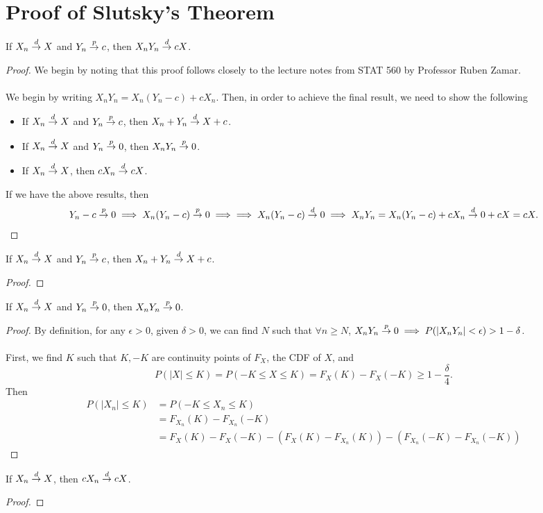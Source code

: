 

\section{Proof of Slutsky's Theorem}
\begin{theorem}
If $X_n \overset{d}{\rightarrow} X$ and $Y_n \overset{p}{\rightarrow} c$, then $X_nY_n \overset{d}{\rightarrow} cX$.
\end{theorem}
\begin{proof}
We begin by noting that this proof follows closely to the lecture notes from STAT 560 by Professor Ruben Zamar.\\\\
We begin by writing $X_nY_n = X_n(Y_n-c)+cX_n$. Then, in order to achieve the final result, we need to show the following
\begin{itemize}
\item If $X_n \overset{d}{\rightarrow} X$ and $Y_n \overset{p}{\rightarrow} c$, then $X_n + Y_n \overset{d}{\rightarrow} X + c$.
\item If $X_n \overset{d}{\rightarrow} X$ and $Y_n \overset{p}{\rightarrow} 0$, then $X_nY_n \overset{p}{\rightarrow} 0$.
\item If $X_n \overset{d}{\rightarrow} X$, then $cX_n \overset{d}{\rightarrow} cX$.
\end{itemize}
If we have the above results, then 
\begin{align*}
Y_n - c \overset{p}{\rightarrow} 0 \implies X_n(Y_n-c) \overset{p}{\rightarrow} 0 \implies \implies X_n(Y_n-c) \overset{d}{\rightarrow} 0 \implies X_nY_n = X_n(Y_n-c)+cX_n \overset{d}{\rightarrow} 0 + cX = cX.
\end{align*}
\end{proof}
\begin{lemma}
If $X_n \overset{d}{\rightarrow} X$ and $Y_n \overset{p}{\rightarrow} c$, then $X_n + Y_n \overset{d}{\rightarrow} X + c$.
\end{lemma}
\begin{proof}

\end{proof}
\begin{lemma}
If $X_n \overset{d}{\rightarrow} X$ and $Y_n \overset{p}{\rightarrow} 0$, then $X_nY_n \overset{p}{\rightarrow} 0$.
\end{lemma}
\begin{proof}
By definition, for any $\epsilon>0$, given $\delta>0$, we can find $N$ such that $\forall n\geq N$, $X_nY_n\overset{p}{\rightarrow} 0 \implies P(|X_nY_n|<\epsilon)>1-\delta$.\\\\
First, we find $K$ such that $K,-K$ are continuity points of $F_X$, the CDF of $X$, and
\[
P(|X|\leq K) = P(-K\leq X\leq K) = F_X(K) - F_X(-K) \geq 1-\frac{\delta}{4}.
\]
Then
\begin{align*}
P(|X_n|\leq K) &= P(-K\leq X_n \leq K)\\
&= F_{X_n}(K) - F_{X_n}(-K)\\
&= F_X(K) - F_X(-K) - (F_{X}(K) - F_{X_n}(K)) - (F_{X_n}(-K) - F_{X_n}(-K))
\end{align*}
\end{proof}
\begin{lemma}
If $X_n \overset{d}{\rightarrow} X$, then $cX_n \overset{d}{\rightarrow} cX$.
\end{lemma}
\begin{proof}

\end{proof}
